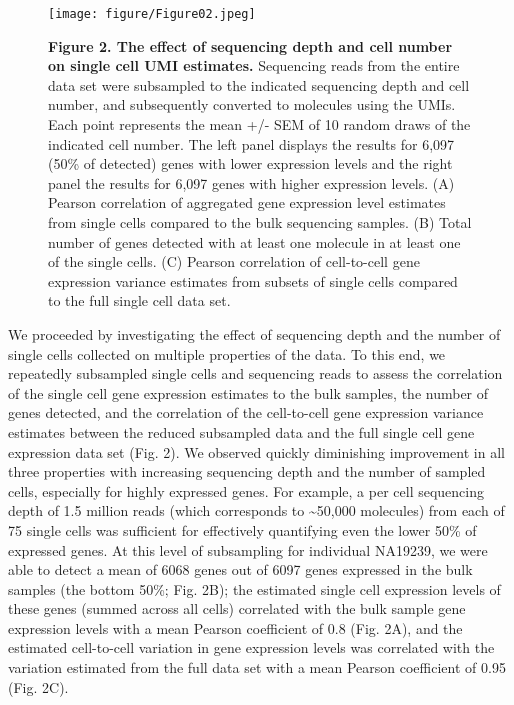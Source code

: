 \begin{figure}[htbp]
\centering
\texttt{[image: figure/Figure02.jpeg]}
\caption{\textbf{Figure 2. The effect of sequencing depth and cell
number on single cell UMI estimates.} Sequencing reads from the entire
data set were subsampled to the indicated sequencing depth and cell
number, and subsequently converted to molecules using the UMIs. Each
point represents the mean +/- SEM of 10 random draws of the indicated
cell number. The left panel displays the results for 6,097 (50\% of
detected) genes with lower expression levels and the right panel the
results for 6,097 genes with higher expression levels. (A) Pearson
correlation of aggregated gene expression level estimates from single
cells compared to the bulk sequencing samples. (B) Total number of genes
detected with at least one molecule in at least one of the single cells.
(C) Pearson correlation of cell-to-cell gene expression variance
estimates from subsets of single cells compared to the full single cell
data set.}
\end{figure}

We proceeded by investigating the effect of sequencing depth and the
number of single cells collected on multiple properties of the data. To
this end, we repeatedly subsampled single cells and sequencing reads to
assess the correlation of the single cell gene expression estimates to
the bulk samples, the number of genes detected, and the correlation of
the cell-to-cell gene expression variance estimates between the reduced
subsampled data and the full single cell gene expression data set (Fig.
2). We observed quickly diminishing improvement in all three properties
with increasing sequencing depth and the number of sampled cells,
especially for highly expressed genes. For example, a per cell
sequencing depth of 1.5 million reads (which corresponds to
\textasciitilde{}50,000 molecules) from each of 75 single cells was
sufficient for effectively quantifying even the lower 50\% of expressed
genes. At this level of subsampling for individual NA19239, we were able
to detect a mean of 6068 genes out of 6097 genes expressed in the bulk
samples (the bottom 50\%; Fig. 2B); the estimated single cell expression
levels of these genes (summed across all cells) correlated with the bulk
sample gene expression levels with a mean Pearson coefficient of 0.8
(Fig. 2A), and the estimated cell-to-cell variation in gene expression
levels was correlated with the variation estimated from the full data
set with a mean Pearson coefficient of 0.95 (Fig. 2C).

